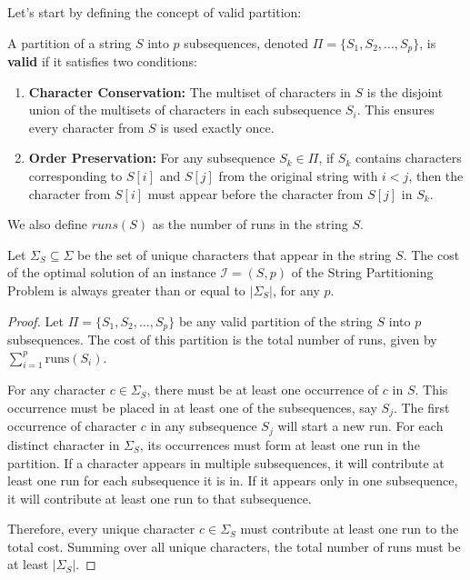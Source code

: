 Let's start by defining the concept of valid partition:
\begin{definition}
    \label{def:valid_partition}
    A partition of a string $S$ into $p$ subsequences, denoted $\Pi = \{S_1, S_2, \dots, S_p\}$, is \textbf{valid} if it satisfies two conditions:
    \begin{enumerate}[leftmargin=25pt]
        \item \textbf{Character Conservation:} The multiset of characters in $S$ is the disjoint union of the multisets of characters in each subsequence $S_i$. This ensures every character from $S$ is used exactly once.
        \item \textbf{Order Preservation:} For any subsequence $S_k \in \Pi$, if $S_k$ contains characters corresponding to $S[i]$ and $S[j]$ from the original string with $i < j$, then the character from $S[i]$ must appear before the character from $S[j]$ in $S_k$.
    \end{enumerate}
\end{definition}

We also define $runs(S)$ as the number of runs in the string $S$.

\begin{lemma} \label{lemma:optimal_cost}
    Let $\Sigma_S \subseteq \Sigma$ be the set of unique characters that appear in the string $S$. The cost of the optimal solution of an instance $\mathcal{I}=(S,p)$ of the String Partitioning Problem is always greater than or equal to $|\Sigma_S|$, for any $p$.
\end{lemma}

\begin{proof}
    Let $\Pi = \{S_1, S_2, \dots, S_p\}$ be any valid partition of the string $S$ into $p$ subsequences. The cost of this partition is the total number of runs, given by $\sum_{i=1}^{p} \text{runs}(S_i)$.

    For any character $c \in \Sigma_S$, there must be at least one occurrence of $c$ in $S$. This occurrence must be placed in at least one of the subsequences, say $S_j$. The first occurrence of character $c$ in any subsequence $S_j$ will start a new run. For each distinct character in $\Sigma_S$, its occurrences must form at least one run in the partition. If a character appears in multiple subsequences, it will contribute at least one run for each subsequence it is in. If it appears only in one subsequence, it will contribute at least one run to that subsequence.

    Therefore, every unique character $c \in \Sigma_S$ must contribute at least one run to the total cost. Summing over all unique characters, the total number of runs must be at least $|\Sigma_S|$.
\end{proof}

